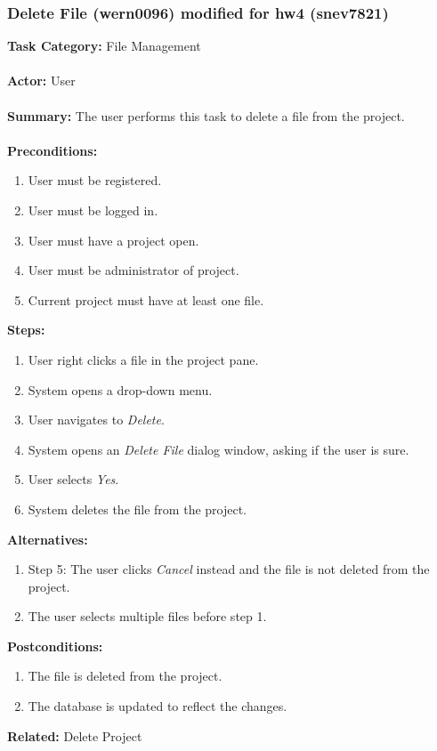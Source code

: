 \documentclass[11pt]{report}
\begin{document}
\newpage

\subsubsection{Delete File (wern0096) modified for hw4 (snev7821)}
\begin{framed}

	\textbf{Task Category:} File Management \\ \\
	\textbf{Actor:} User \\ \\
	\textbf{Summary:} The user performs this task to delete a file from the project. \\ \\
	\textbf{Preconditions:} 
	\begin{enumerate}
		\item User must be registered.
		\item User must be logged in.
		\item User must have a project open.
		\item User must be administrator of project.
		\item Current project must have at least one file.
	\end{enumerate}
	\textbf{Steps:}
	\begin{enumerate}
		\item User right clicks a file in the project pane.
		\item System opens a drop-down menu.
		\item User navigates to \textit{Delete}.
		\item System opens an \textit{Delete File} dialog window, asking if the user is sure.
		\item User selects \textit{Yes}.
		\item System deletes the file from the project.
	\end{enumerate}
	\textbf{Alternatives:} 
	\begin{enumerate}
		\item Step 5: The user clicks \textit{Cancel} instead and the file is not deleted from the project.
		\item The user selects multiple files before step 1.
	\end{enumerate}
	\textbf{Postconditions:}
	\begin{enumerate}
		\item The file is deleted from the project.
		\item The database is updated to reflect the changes.
	\end{enumerate}
		\textbf{Related:} Delete Project
\end{framed} 
\newpage
\end{document}
